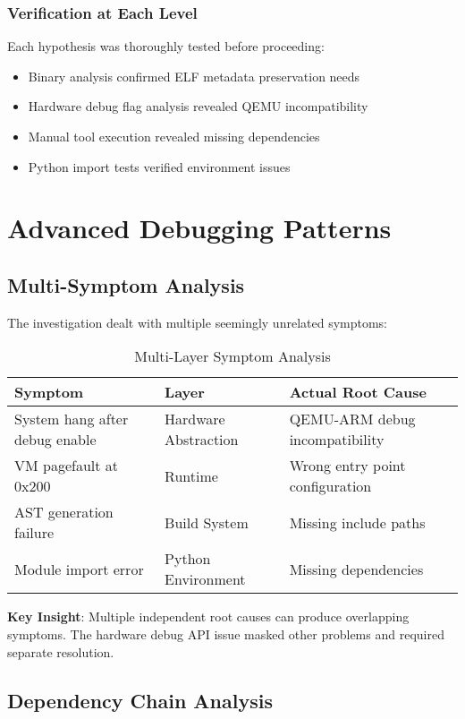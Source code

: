 \documentclass[11pt,a4paper]{article}
\begin{document}
\subsubsection{Verification at Each Level}

Each hypothesis was thoroughly tested before proceeding:
\begin{itemize}
\item Binary analysis confirmed ELF metadata preservation needs
\item Hardware debug flag analysis revealed QEMU incompatibility
\item Manual tool execution revealed missing dependencies
\item Python import tests verified environment issues
\end{itemize}

\section{Advanced Debugging Patterns}

\subsection{Multi-Symptom Analysis}

The investigation dealt with multiple seemingly unrelated symptoms:

\begin{table}[h]
\centering
\begin{tabular}{|p{3cm}|p{4cm}|p{6cm}|}
\hline
\textbf{Symptom} & \textbf{Layer} & \textbf{Actual Root Cause} \\
\hline
System hang after debug enable & Hardware Abstraction & QEMU-ARM debug incompatibility \\
\hline
VM pagefault at 0x200 & Runtime & Wrong entry point configuration \\
\hline
AST generation failure & Build System & Missing include paths \\
\hline
Module import error & Python Environment & Missing dependencies \\
\hline
\end{tabular}
\caption{Multi-Layer Symptom Analysis}
\end{table}

\textbf{Key Insight}: Multiple independent root causes can produce overlapping symptoms. The hardware debug API issue masked other problems and required separate resolution.

\subsection{Dependency Chain Analysis}
\end{document}
